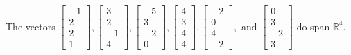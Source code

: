 \begin{exercise}
\begin{exerciseStatement}
  \end{exerciseStatement}
  \begin{exerciseAnswer}
   The vectors \(\left[\begin{array}{r}
-1 \\
2 \\
2 \\
1
\end{array}\right] , \left[\begin{array}{r}
3 \\
2 \\
-1 \\
4
\end{array}\right] , \left[\begin{array}{r}
-5 \\
3 \\
-2 \\
0
\end{array}\right] , \left[\begin{array}{r}
4 \\
3 \\
4 \\
4
\end{array}\right] , \left[\begin{array}{r}
-2 \\
0 \\
4 \\
-2
\end{array}\right] , \text{ and } \left[\begin{array}{r}
0 \\
3 \\
-2 \\
3
\end{array}\right]\) 
  	 do  
	span \(\mathbb{R}^4\).
  


  \end{exerciseAnswer}
\end{exercise}